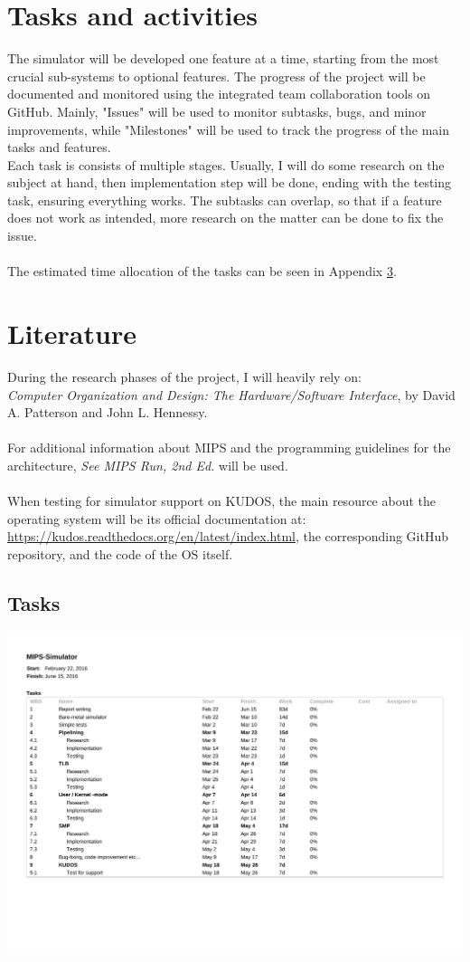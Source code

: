 \documentclass[11pt]{article}
\begin{document}
\section{Tasks and activities}
The simulator will be developed one feature at a time, starting from the most crucial sub-systems to optional features. The progress of the project will be documented and monitored  using the integrated team collaboration tools on GitHub. Mainly, "Issues" will be used to monitor subtasks, bugs, and minor improvements, while "Milestones" will be used to track the progress of the main tasks and features.\\
Each task is consists of multiple stages. Usually, I will do some research on the subject at hand, then implementation step will be done, ending with the testing task, ensuring everything works. The subtasks can overlap, so that if a feature does not work as intended, more research on the matter can be done to fix the issue.\\\\
The estimated time allocation of the tasks can be seen in Appendix \ref{appendix:Tasks}.


\section{Literature}
During the research phases of the project, I will heavily rely on:\\
 \textit{Computer Organization and Design: The Hardware/Software Interface}, by David A. Patterson and John L. Hennessy.\\\\
For additional information about MIPS and the programming guidelines for the architecture, \textit{See MIPS Run, 2nd Ed.} will be used.\\\\
When testing for simulator support on KUDOS, the main resource about the operating system will be its official documentation at: \url{https://kudos.readthedocs.org/en/latest/index.html}, the corresponding GitHub repository, and the code of the OS itself.

\newpage
\appendix
\begin{appendices}
\section{Tasks}
\label{appendix:Tasks}
\includegraphics[scale=0.8,angle=270]{tasks.pdf}
%
\end{appendices}
\end{document}
